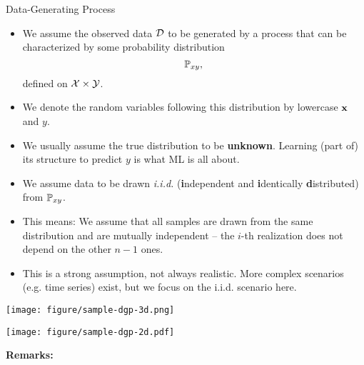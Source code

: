 \documentclass[11pt,compress,t,notes=noshow, xcolor=table]{beamer}
\begin{document}
\begin{vbframe}{Data-Generating Process}

\begin{itemize}

  \item We assume the observed data $\mathcal{D}$ to be generated by a process that can
  be characterized by some probability distribution $$\mathbb{P}_{xy},$$ defined on 
  $\mathcal{X} \times \mathcal{Y}$.
  
  \item We denote the random variables following this 
  distribution by lowercase $\mathbf{x}$ and $y$.
  
  \item We usually assume the true distribution to be \textbf{unknown}. 
  Learning (part of) its structure to predict $y$ is what ML is all about.
  
  \framebreak
  
  \item We assume data to be drawn \emph{i.i.d.} (\textbf{i}ndependent and \textbf{i}dentically 
    \textbf{d}istributed) from $\mathbb{P}_{xy}$. %

    
    \item This means: We assume that all samples are drawn from the same distribution 
    and are mutually independent -- the $i$-th realization does not depend on the
    other $n-1$ ones.
    
    \item This is a strong assumption, not always realistic. 
    More complex scenarios (e.g. time series) exist, but we focus on the i.i.d. scenario here. 
    
  


\end{itemize}

\begin{minipage}{0.5\textwidth}
  \centering
  \texttt{[image: figure/sample-dgp-3d.png]}
\end{minipage}%
\begin{minipage}{0.5\textwidth}
  \texttt{[image: figure/sample-dgp-2d.pdf]}
\end{minipage}

\framebreak

\textbf{Remarks:}

\begin{itemize}


\end{itemize}
\end{vbframe}
\end{document}

